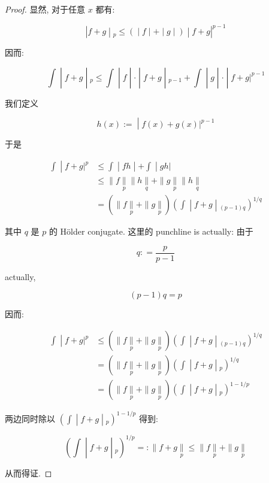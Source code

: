 \begin{proof}

显然, 对于任意 \(x\) 都有:

\[\left. |f + g \middle| {}_{p} \leq ( \middle| f \middle| + \middle| g \middle| ) \middle| f + g|^{p - 1} \right.\]

因而:

\[\left. \int \middle| f + g \middle| {}_{p} \leq \int \middle| f \middle| \cdot \middle| f + g \middle| {}_{p - 1} + \int \middle| g \middle| \cdot \middle| f + g|^{p - 1} \right.\]

我们定义

\[\left. h(x) := \middle| f(x) + g(x)|^{p - 1} \right.\]

于是

\[\begin{matrix}
\left. \int \middle| f + g|^{p} \right. & \left. \leq \int \middle| fh \middle| + \int \middle| gh| \right. \\
 & {\leq \parallel f\underset{p}{\parallel} \parallel h\underset{q}{\parallel} + \parallel g\underset{p}{\parallel} \parallel h\underset{q}{\parallel}} \\
 & \left. = ( \parallel f\underset{p}{\parallel} + \parallel g\underset{p}{\parallel})(\int \middle| f + g \middle| {}_{(p - 1)q})^{1/q} \right.
\end{matrix}\]

其中 \(q\) 是 \(p\) 的 Hölder conjugate. 这里的 punchline is actually: 由于

\[q: = \frac{p}{p - 1}\]

actually,

\[(p - 1)q = p\]

因而:

\[\begin{matrix}
\left. \int \middle| f + g|^{p} \right. & \left. \leq ( \parallel f\underset{p}{\parallel} + \parallel g\underset{p}{\parallel})(\int \middle| f + g \middle| {}_{(p - 1)q})^{1/q} \right. \\
 & \left. = ( \parallel f\underset{p}{\parallel} + \parallel g\underset{p}{\parallel})(\int \middle| f + g \middle| {}_{p})^{1/q} \right. \\
 & \left. = ( \parallel f\underset{p}{\parallel} + \parallel g\underset{p}{\parallel})(\int \middle| f + g \middle| {}_{p})^{1 - 1/p} \right.
\end{matrix}\]

两边同时除以 \(\left. (\int \middle| f + g \middle| {}_{p})^{1 - 1/p} \right.\) 得到:

\[\left. (\int \middle| f + g \middle| {}_{p})^{1/p} = : \parallel f + g\underset{p}{\parallel} \leq \parallel f\underset{p}{\parallel} + \parallel g\underset{p}{\parallel} \right.\]

从而得证.

\end{proof}

